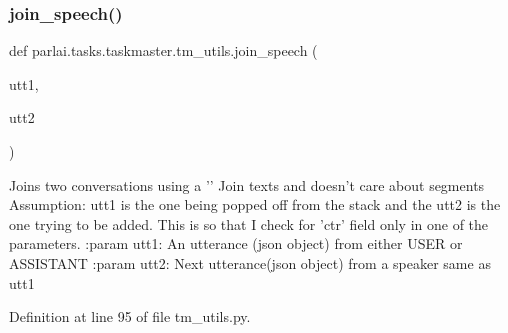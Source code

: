\mbox{\label{namespaceparlai_1_1tasks_1_1taskmaster_1_1tm__utils_ad5d13cd462bd26919f078aa93174e9cd}} 
\subsubsection{\texorpdfstring{join\+\_\+speech()}{join\_speech()}}
{\footnotesize\ttfamily def parlai.\+tasks.\+taskmaster.\+tm\+\_\+utils.\+join\+\_\+speech (\begin{DoxyParamCaption}\item[{}]{utt1,  }\item[{}]{utt2 }\end{DoxyParamCaption})}

\begin{DoxyVerb}Joins two conversations using a '\n'
Join texts and doesn't care about segments
Assumption: utt1 is the one being popped off from the stack and the utt2
            is the one trying to be added. This is so that I check for 'ctr'
            field only in one of the parameters.
:param utt1:
    An utterance (json object) from either USER or ASSISTANT
:param utt2:
    Next utterance(json object) from a speaker same as utt1
\end{DoxyVerb}
 

Definition at line 95 of file tm\+\_\+utils.\+py.


